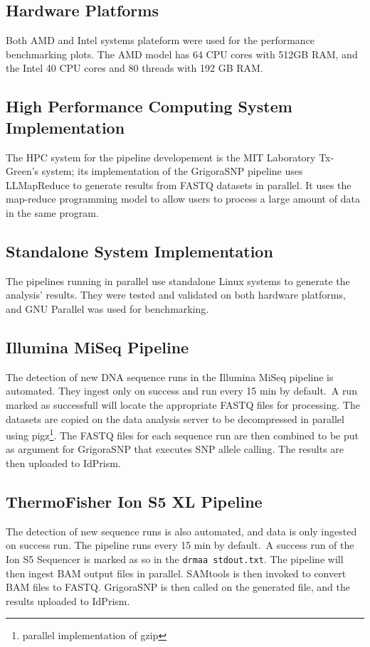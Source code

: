 \documentclass[../main.tex]{subfiles}
\begin{document}
\subsection{Hardware Platforms}

Both AMD and Intel systems plateform were used for the performance benchmarking plots. The AMD model has 64 CPU cores with 512GB RAM, and the Intel 40 CPU cores and 80 threads with 192 GB RAM.

\subsection{High Performance Computing System Implementation}

The HPC system for the pipeline developement is the MIT Laboratory Tx-Green's system; its implementation of the GrigoraSNP pipeline uses LLMapReduce to generate results from FASTQ datasets in parallel. It uses the map-reduce programming model to allow users to process a large amount of data in the same program.

\subsection{Standalone System Implementation}

The pipelines running in parallel use standalone Linux systems to generate the analysis' results. They were tested and validated on both hardware platforms, and GNU Parallel was used for benchmarking.

\subsection{Illumina MiSeq Pipeline}

The detection of new DNA sequence runs in the Illumina MiSeq pipeline is automated. They ingest only on success and run every 15 min by default.\
A run marked as successfull will locate the appropriate FASTQ files for processing. The datasets are copied on the data analysis server to be decompressed in parallel using pigz\footnote{parallel implementation of gzip}. The FASTQ files for each sequence run are then combined to be put as argument for GrigoraSNP that executes SNP allele calling. The results are then uploaded to IdPrism.

\subsection{ThermoFisher Ion S5 XL Pipeline}

The detection of new sequence runs is also automated, and data is only ingested on success run. The pipeline runs every 15 min by default.\
A success run of the Ion S5 Sequencer is marked as so in the \texttt{drmaa stdout.txt}. The pipeline will then ingest BAM output files in parallel. SAMtools is then invoked to convert BAM files to FASTQ. GrigoraSNP is then called on the generated file, and the results uploaded to IdPrism.
  
\end{document}
